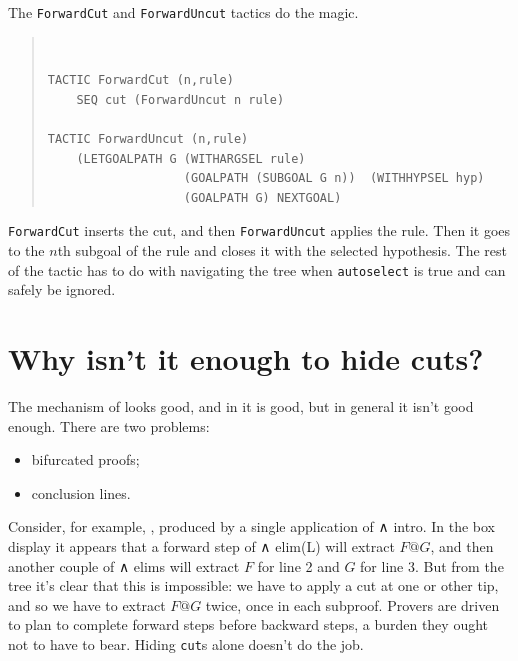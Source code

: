 \documentclass[11pt]{article}
\newenvironment{japeish}{\begin{quote}\tt\small}{\end{quote}}
\newcommand{\textj}[1]{{\tt\small{#1}}}
\begin{document}
The \textj{ForwardCut} and \textj{ForwardUncut} tactics do the magic.
\begin{japeish}
\begin{verbatim}
TACTIC ForwardCut (n,rule)
    SEQ cut (ForwardUncut n rule)

TACTIC ForwardUncut (n,rule)
    (LETGOALPATH G (WITHARGSEL rule) 
                   (GOALPATH (SUBGOAL G n))  (WITHHYPSEL hyp) 
                   (GOALPATH G) NEXTGOAL)

\end{verbatim}
\end{japeish}
\textj{ForwardCut} inserts the cut, and then \textj{ForwardUncut} applies the rule. Then it goes to the $n$th subgoal of the rule and closes it with the selected hypothesis. The rest of the tactic has to do with navigating the tree when \textj{autoselect} is true and can safely be ignored.

\section{Why isn't it enough to hide cuts?}

The mechanism of  looks good, and in  it is good, but in general it isn't good enough. There are two problems: 
\begin{itemize}
\item bifurcated proofs; 
\item conclusion lines.
\end{itemize}

Consider, for example, , produced by a single application of ∧ intro. In the box display it appears that a forward step of ∧ elim(L) will extract $F@G$, and then another couple of ∧ elims will extract $F$ for line 2 and $G$ for line 3. But from the tree it's clear that this is impossible: we have to apply a cut at one or other tip, and so we have to extract $F@G$ twice, once in each subproof. Provers are driven to plan to complete forward steps before backward steps, a burden they ought not to have to bear. Hiding \textj{cut}s alone doesn't do the job. 
\end{document}
